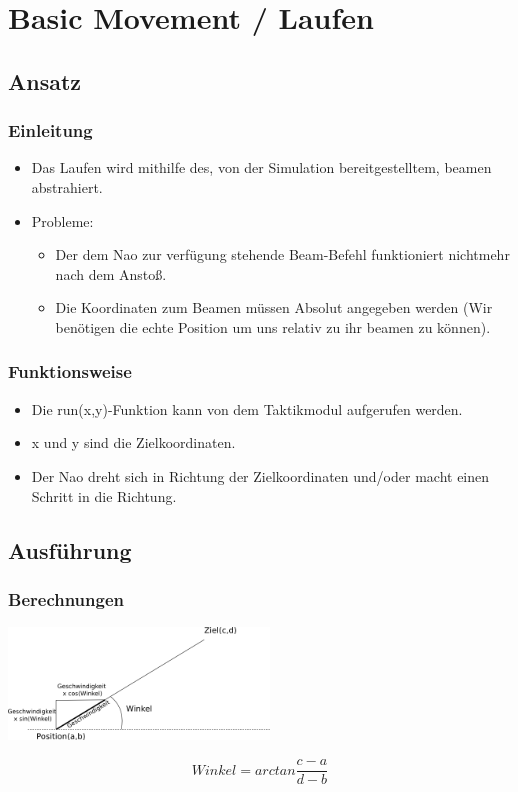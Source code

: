 \section{Basic Movement / Laufen}

\subsection{Ansatz}
\frame
{
	\frametitle{Einleitung}
	\begin{itemize}
		\item Das Laufen wird mithilfe des, von der Simulation bereitgestelltem, beamen abstrahiert.
		\item Probleme:
		\begin{itemize}
			\item Der dem Nao zur verfügung stehende Beam-Befehl funktioniert nichtmehr nach dem Anstoß.
			\item Die Koordinaten zum Beamen müssen Absolut angegeben werden (Wir benötigen die echte Position um uns relativ zu ihr beamen zu können).
		\end{itemize}
	\end{itemize}
}

\frame
{
	\frametitle{Funktionsweise}
	\begin{itemize}
		\item Die run(x,y)-Funktion kann von dem Taktikmodul aufgerufen werden.
		\item x und y sind die Zielkoordinaten.
		\item Der Nao dreht sich in Richtung der Zielkoordinaten und/oder macht einen Schritt in die Richtung.
	\end{itemize}
}

\subsection{Ausführung}
\frame
{
	\frametitle{Berechnungen}
	\begin{center}\includegraphics[height=3cm, center]{geschwindigkeit.png}\end{center}
	\begin{equation}
		Winkel = arctan\frac{c-a}{d-b}
	\end{equation}
}

